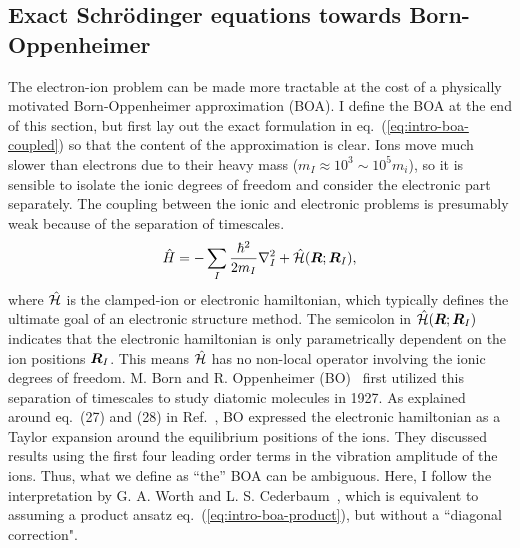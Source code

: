 \subsection{Exact Schr\"odinger equations towards Born-Oppenheimer}
The electron-ion problem can be made more tractable at the cost of a physically motivated Born-Oppenheimer approximation (BOA). I define the BOA at the end of this section, but first lay out the exact formulation in eq.~(\ref{eq:intro-boa-coupled}) so that the content of the approximation is clear.
Ions move much slower than electrons due to their heavy mass ($m_I\approx 10^3\sim 10^5 m_i$), so it is sensible to isolate the ionic degrees of freedom and consider the electronic part separately. The coupling between the ionic and electronic problems is presumably weak because of the separation of timescales.
\begin{align} \label{eq:intro-ei-to-e-ham}
\hat{H} = -\sum_I \frac{\hbar^2}{2m_I} \nabla^2_I
+ \hat{\mathcal{H}}(\boldsymbol{R};\boldsymbol{R}_I),
\end{align}
where $\hat{\mathcal{H}}$ is the clamped-ion or electronic hamiltonian, which typically defines the ultimate goal of an electronic structure method. The semicolon in $\hat{\mathcal{H}}(\boldsymbol{R};\boldsymbol{R}_I)$ indicates that the electronic hamiltonian is only parametrically dependent on the ion positions $\boldsymbol{R}_I$. This means $\hat{\mathcal{H}}$ has no non-local operator involving the ionic degrees of freedom. M. Born and R. Oppenheimer (BO)~\cite{Born1927} first utilized this separation of timescales to study diatomic molecules in 1927. As explained around eq.~(27) and (28) in Ref.~\cite{Born1927}, BO expressed the electronic hamiltonian as a Taylor expansion around the equilibrium positions of the ions. They discussed results using the first four leading order terms in the vibration amplitude of the ions. Thus, what we define as ``the'' BOA can be ambiguous. Here, I follow the interpretation by G. A. Worth and L. S. Cederbaum~\cite{Worth2004}, which is equivalent to assuming a product ansatz eq.~(\ref{eq:intro-boa-product}), but without a ``diagonal correction".



